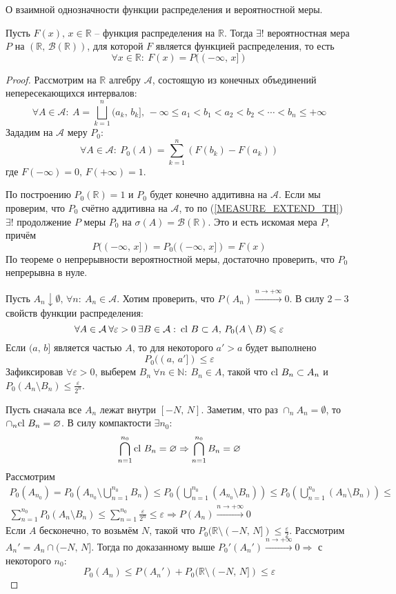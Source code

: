 \begin{theorem}
	О взаимной однозначности функции распределения и вероятностной меры.

	Пусть $F(x),\, x \in \mathbb{R}$ -- функция распределения на $\mathbb{R}$. Тогда $\exists!$ вероятностная мера $P$ на $(\mathbb{R},\, \mathcal{B}(\mathbb{R}))$, для которой $F$ является функцией распределения, то есть
	\[\forall x \in \mathbb{R} :\: F(x) = P((-\infty,\,x])\]
\end{theorem}

\begin{proof}
	Рассмотрим на $\mathbb{R}$ алгебру $\mathcal{A}$, состоящую из конечных объединений непересекающихся интервалов:
	\[\forall A \in \mathcal{A}:\: A = \bigsqcup_{k = 1}^n (a_k,\,b_k],\, -\infty \leq a_1 < b_1 < a_2 < b_2 < \cdots < b_n \leq +\infty\]
	Зададим на $\mathcal{A}$ меру $P_0$:
	\[\forall A \in \mathcal{A}:\: P_0(A) = \sum_{k = 1}^n (F(b_k) - F(a_k))\]
	где $F(-\infty) = 0,\, F(+\infty) = 1$.

	По построению $P_0(\mathbb{R}) = 1$ и $P_0$ будет конечно аддитивна на $\mathcal{A}$. Если мы проверим, что $P_0$ счётно аддитивна на $\mathcal{A}$, то по (\ref{MEASURE_EXTEND_TH}) $\exists!$ продолжение $P$ меры $P_0$ на $\sigma(A) = \mathcal{B}(\mathbb{R})$. Это и есть искомая мера $P$, причём
	\[P((-\infty,\, x]) = P_0((-\infty,\, x]) = F(x)\]
	По теореме о непрерывности вероятностной меры, достаточно проверить, что $P_0$ непрерывна в нуле.

	Пусть $A_n \downarrow \emptyset,\, \forall n :\: A_n \in \mathcal{A}$. Хотим проверить, что $P(A_n) \stackrel{n \to +\infty}{\to} 0$. В силу $2-3$ свойств функции распределения:
	\[\forall A \in \mathcal{A} \: \forall \varepsilon > 0 \: \exists B \in \mathcal{A} :\: \text{cl } B \subset A,\, P_0(A \setminus B) \leqslant \varepsilon\]
	Если $(a,\,b]$ является частью $A$, то для некоторого $a' > a$ будет выполнено
	\[P_0((a,\, a']) \leq \varepsilon\]
	Зафиксировав $\forall \varepsilon > 0$, выберем $B_n \: \forall n \in \mathbb{N}:\: B_n \in A$, такой что $\text{cl } B_n \subset A_n$ и $P_0(A_n \setminus B_n) \leq \frac{\varepsilon}{2^n}$.

	Пусть сначала все $A_n$ лежат внутри $[-N,\,N]$. Заметим, что раз $\cap_n A_n = \emptyset$, то $\cap_n \text{cl } B_n = \varnothing$. В силу компактости $\exists n_0$:
	\[\bigcap_{n = 1}^{n_0} \text{cl } B_n = \varnothing \Rightarrow \bigcap_{n = 1}^{n_0} B_n = \varnothing\]
	Рассмотрим
	\begin{align*}
		P_0(A_{n_0}) = P_0\left(A_{n_0} \setminus \bigcup_{n = 1}^{n_0}B_n\right) \leq P_0\left(\bigcup_{n = 1}^{n_0}(A_{n_0}\setminus B_n)\right) \leq P_0\left(\bigcup_{n = 1}^{n_0}(A_n \setminus B_n)\right) \leq \\
		\sum_{n = 1}^{n_0}P_0(A_n \setminus B_n) \leq \sum_{n = 1}^{n_0}\frac{\varepsilon}{2^n} \leq \varepsilon \Rightarrow P(A_n) \stackrel{n \to +\infty}{\to} 0
	\end{align*}
	Если $A$ бесконечно, то возьмём $N$, такой что $P_0(\mathbb{R} \setminus (-N,\, N]) \leq \frac{\varepsilon}{2}$. Рассмотрим $A_n' = A_n \cap (-N,\, N]$. Тогда по доказанному выше $P_0'(A_n') \stackrel{n \to +\infty}{\to} 0 \Rightarrow$ с некоторого $n_0$:
	\[P_0(A_n) \leq P(A_n') + P_0(\mathbb{R}\setminus (-N,\, N]) \leq \varepsilon\]
\end{proof}
